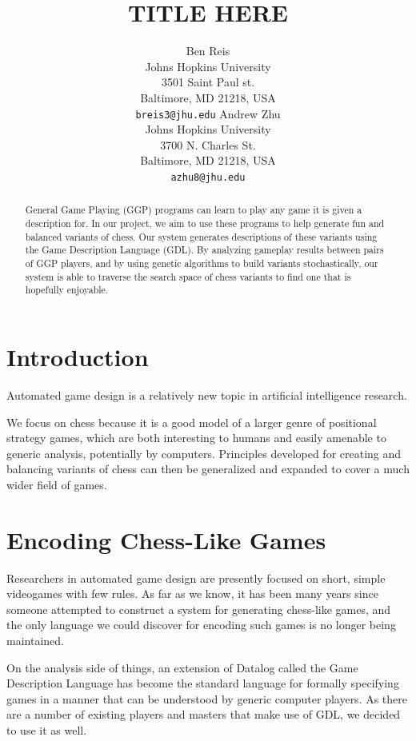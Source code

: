 \documentclass[11pt,letterpaper]{article}
\title{TITLE HERE}
\author{Ben Reis \\
  Johns Hopkins University\\
  3501 Saint Paul st.\\
  Baltimore, MD 21218, USA\\
  {\tt breis3@jhu.edu}
  \And
  Andrew Zhu \\
  Johns Hopkins University \\
  3700 N. Charles St. \\
  Baltimore, MD 21218, USA\\
  {\tt azhu8@jhu.edu}}
\date{}
\begin{document}
\maketitle
\begin{abstract}
General Game Playing (GGP) programs can learn to play any game it is given a description for. In our project, we aim to use these programs to help generate fun and balanced variants of chess. Our system generates descriptions of these variants using the Game Description Language (GDL). By analyzing gameplay results between pairs of GGP players, and by using genetic algorithms to build variants stochastically, our system is able to traverse the search space of chess variants to find one that is hopefully enjoyable.
\end{abstract}

\section{Introduction}
Automated game design is a relatively new topic in artificial intelligence
research. %


We focus on chess because it is a good model of a larger genre of positional
strategy games, which are both interesting to humans and easily amenable to
generic analysis, potentially by computers. Principles developed for creating
and balancing variants of chess can then be generalized and expanded to cover
a much wider field of games.

\section{Encoding Chess-Like Games}

Researchers in automated game design are presently focused on short, simple
videogames with few rules. As far as we know, it has been many years since
someone attempted to construct a system for generating chess-like games, and the
only language we could discover for encoding such games is no longer being
maintained.

On the analysis side of things, an extension of Datalog called the Game
Description Language has become the standard language for formally specifying
games in a manner that can be understood by generic computer players. As there
are a number of existing players and masters that make use of GDL, we decided to
use it as well.
\end{document}
